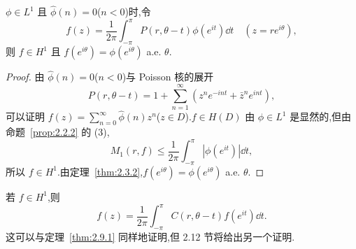 \begin{proposition}\label{prop:2.9.3}
$\phi \in L^{1}$ 且 $\hat{\phi}(n) = 0$($n < 0$)时,令
\begin{equation*}
f(z) = \frac{1}{2\pi}\int_{-\pi}^{\pi}P(r, \theta - t)\phi(e^{it})\dd t \quad (z = re^{i\theta}),
\end{equation*}
则 $f \in H^{1}$ 且 $f(e^{i\theta}) = \phi(e^{i\theta})$ a.e. $\theta$.
\end{proposition}

\begin{proof}
由 $\hat{\phi}(n) = 0$($n < 0$)与 Poisson 核的展开
\begin{equation*}
P(r, \theta - t) = 1 + \sum_{n = 1}^{\infty}\left(z^{n}e^{-int} + \bar{z}^{n}e^{int}\right),
\end{equation*}
可以证明 $f(z) = \sum_{n=0}^{\infty}\hat{\phi}(n)z^{n}$($z \in D$).$f \in H(D)$ 由 $\phi \in L^{1}$ 是显然的,但由命题~\ref{prop:2.2.2} 的 (3),
\begin{equation*}
M_{1}(r, f) \leq \frac{1}{2\pi}\int_{-\pi}^{\pi}|\phi(e^{it})|\dd t,
\end{equation*}
所以 $f \in H^{1}$.由定理~\ref{thm:2.3.2},$f(e^{i\theta}) = \phi(e^{i\theta})$ a.e. $\theta$.
\end{proof}

若 $f \in H^{1}$,则
\begin{equation*}
f(z) = \frac{1}{2\pi}\int_{-\pi}^{\pi}C(r, \theta - t)f(e^{it})\dd t.
\end{equation*}
这可以与定理~\ref{thm:2.9.1} 同样地证明,但 2.12 节将给出另一个证明.
